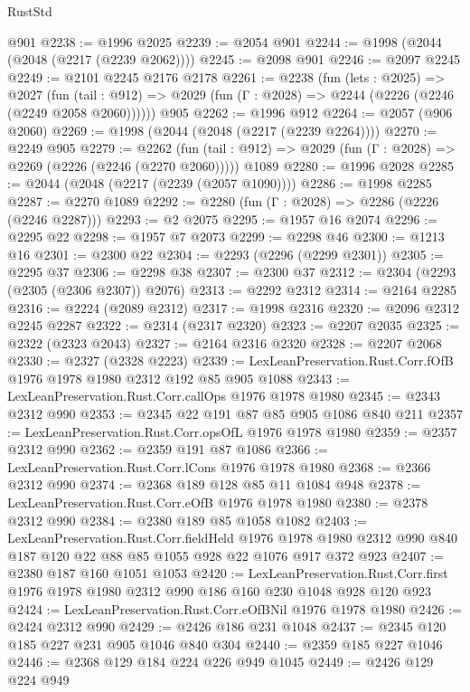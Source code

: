 \begin{lexlean}{RustStd}
\begin{coremodule}
    @901
@2238 := @1996 @2025
@2239 := @2054 @901
@2244 := @1998 (@2044 (@2048 (@2217 (@2239 @2062))))
@2245 := @2098 @901
@2246 := @2097 @2245
@2249 := @2101 @2245 @2176 @2178
@2261 := @2238
    (fun (lets : @2025) =>
    @2027
      (fun (tail : @912) => @2029 (fun (Γ : @2028) => @2244 (@2226 (@2246 (@2249 @2058 @2060))))))
    @905
@2262 := @1996 @912
@2264 := @2057 (@906 @2060)
@2269 := @1998 (@2044 (@2048 (@2217 (@2239 @2264))))
@2270 := @2249 @905
@2279 := @2262
    (fun (tail : @912) => @2029 (fun (Γ : @2028) => @2269 (@2226 (@2246 (@2270 @2060)))))
    @1089
@2280 := @1996 @2028
@2285 := @2044 (@2048 (@2217 (@2239 (@2057 @1090))))
@2286 := @1998 @2285
@2287 := @2270 @1089
@2292 := @2280 (fun (Γ : @2028) => @2286 (@2226 (@2246 @2287)))
@2293 := @2 @2075
@2295 := @1957 @16 @2074
@2296 := @2295 @22
@2298 := @1957 @7 @2073
@2299 := @2298 @46
@2300 := @1213 @16
@2301 := @2300 @22
@2304 := @2293 (@2296 (@2299 @2301))
@2305 := @2295 @37
@2306 := @2298 @38
@2307 := @2300 @37
@2312 := @2304 (@2293 (@2305 (@2306 @2307)) @2076)
@2313 := @2292 @2312
@2314 := @2164 @2285
@2316 := @2224 (@2089 @2312)
@2317 := @1998 @2316
@2320 := @2096 @2312 @2245 @2287
@2322 := @2314 (@2317 @2320)
@2323 := @2207 @2035
@2325 := @2322 (@2323 @2043)
@2327 := @2164 @2316 @2320
@2328 := @2207 @2068
@2330 := @2327 (@2328 @2223)
@2339 := LexLeanPreservation.Rust.Corr.fOfB @1976 @1978 @1980 @2312 @192 @85 @905 @1088
@2343 := LexLeanPreservation.Rust.Corr.callOps @1976 @1978 @1980
@2345 := @2343 @2312 @990
@2353 := @2345 @22 @191 @87 @85 @905 @1086 @840 @211
@2357 := LexLeanPreservation.Rust.Corr.opsOfL @1976 @1978 @1980
@2359 := @2357 @2312 @990
@2362 := @2359 @191 @87 @1086
@2366 := LexLeanPreservation.Rust.Corr.lCons @1976 @1978 @1980
@2368 := @2366 @2312 @990
@2374 := @2368 @189 @128 @85 @11 @1084 @948
@2378 := LexLeanPreservation.Rust.Corr.eOfB @1976 @1978 @1980
@2380 := @2378 @2312 @990
@2384 := @2380 @189 @85 @1058 @1082
@2403 := LexLeanPreservation.Rust.Corr.fieldHeld
    @1976
    @1978
    @1980
    @2312
    @990
    @840
    @187
    @120
    @22
    @88
    @85
    @1055
    @928
    @22
    @1076
    @917
    @372
    @923
@2407 := @2380 @187 @160 @1051 @1053
@2420 := LexLeanPreservation.Rust.Corr.first
    @1976
    @1978
    @1980
    @2312
    @990
    @186
    @160
    @230
    @1048
    @928
    @120
    @923
@2424 := LexLeanPreservation.Rust.Corr.eOfBNil @1976 @1978 @1980
@2426 := @2424 @2312 @990
@2429 := @2426 @186 @231 @1048
@2437 := @2345 @120 @185 @227 @231 @905 @1046 @840 @304
@2440 := @2359 @185 @227 @1046
@2446 := @2368 @129 @184 @224 @226 @949 @1045
@2449 := @2426 @129 @224 @949

\end{coremodule}
\end{lexlean}
